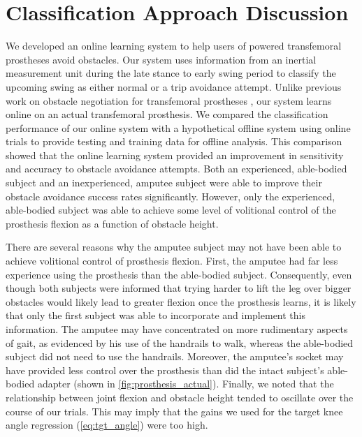 \section{Classification Approach Discussion}

We developed an online learning system to help users of powered transfemoral
prostheses avoid obstacles. Our system uses information from an inertial
measurement unit during the late stance to early swing period to classify the
upcoming swing as either normal or a trip avoidance attempt. Unlike previous
work on obstacle negotiation for transfemoral prostheses
\citep{lawson2010stumble, zhang2011towards, shirota2014recovery}, our system
learns online on an actual transfemoral prosthesis. We compared the
classification performance of our online system with a hypothetical offline
system using online trials to provide testing and training data for offline
analysis. This comparison showed that the online learning system provided an
improvement in sensitivity and accuracy to obstacle avoidance attempts. Both an
experienced, able-bodied subject and an inexperienced, amputee subject were able
to improve their obstacle avoidance success rates significantly. However, only
the experienced, able-bodied subject was able to achieve some level of
volitional control of the prosthesis flexion as a function of obstacle height.
                                  
There are several reasons why the amputee subject may not have been able to
achieve volitional control of prosthesis flexion. First, the amputee had far
less experience using the prosthesis than the able-bodied subject. Consequently,
even though both subjects were informed that trying harder to lift the leg over
bigger obstacles would likely lead to greater flexion once the prosthesis
learns, it is likely that only the first subject was able to incorporate and
implement this information. The amputee may have concentrated on more
rudimentary aspects of gait, as evidenced by his use of the handrails to walk,
whereas the able-bodied subject did not need to use the handrails. Moreover,
the amputee's socket may have provided less control over the prosthesis than did
the intact subject's able-bodied adapter (shown in
\cref{fig:prosthesis_actual}).  Finally, we noted that the relationship between
joint flexion and obstacle height tended to oscillate over the course of our
trials. This may imply that the gains we used for the target knee angle
regression (\cref{eq:tgt_angle}) were too high.


